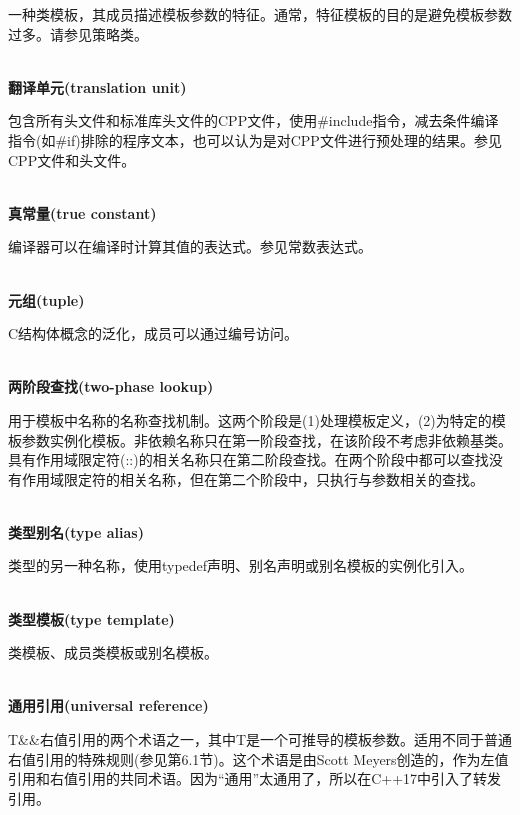 一种类模板，其成员描述模板参数的特征。通常，特征模板的目的是避免模板参数过多。请参见策略类。

\hspace*{\fill} \\ %
\noindent
\textbf{翻译单元(translation unit)}

包含所有头文件和标准库头文件的CPP文件，使用\#include指令，减去条件编译指令(如\#if)排除的程序文本，也可以认为是对CPP文件进行预处理的结果。参见CPP文件和头文件。

\hspace*{\fill} \\ %
\noindent
\textbf{真常量(true constant)}

编译器可以在编译时计算其值的表达式。参见常数表达式。

\hspace*{\fill} \\ %
\noindent
\textbf{元组(tuple)}

C结构体概念的泛化，成员可以通过编号访问。

\hspace*{\fill} \\ %
\noindent
\textbf{两阶段查找(two-phase lookup)}

用于模板中名称的名称查找机制。这两个阶段是(1)处理模板定义，(2)为特定的模板参数实例化模板。非依赖名称只在第一阶段查找，在该阶段不考虑非依赖基类。具有作用域限定符(::)的相关名称只在第二阶段查找。在两个阶段中都可以查找没有作用域限定符的相关名称，但在第二个阶段中，只执行与参数相关的查找。

\hspace*{\fill} \\ %
\noindent
\textbf{类型别名(type alias)}

类型的另一种名称，使用typedef声明、别名声明或别名模板的实例化引入。

\hspace*{\fill} \\ %
\noindent
\textbf{类型模板(type template)}

类模板、成员类模板或别名模板。

\hspace*{\fill} \\ %
\noindent
\textbf{通用引用(universal reference)}

T\&\&右值引用的两个术语之一，其中T是一个可推导的模板参数。适用不同于普通右值引用的特殊规则(参见第6.1节)。这个术语是由Scott Meyers创造的，作为左值引用和右值引用的共同术语。因为“通用”太通用了，所以在C++17中引入了转发引用。

